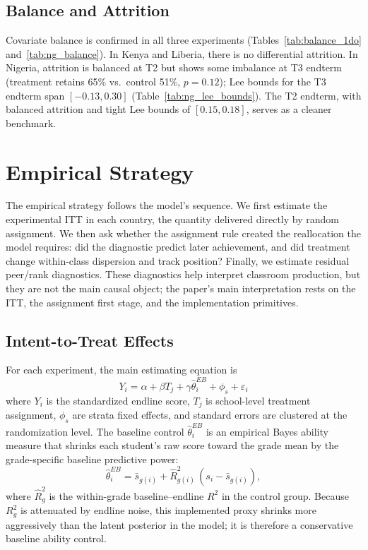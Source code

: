 \documentclass[11pt]{article}
\begin{document}
\subsection{Balance and Attrition}

Covariate balance is confirmed in all three experiments (Tables~\ref{tab:balance_1do} and~\ref{tab:ng_balance}). In Kenya and Liberia, there is no differential attrition. In Nigeria, attrition is balanced at T2 but shows some imbalance at T3 endterm (treatment retains 65\% vs.\ control 51\%, $p = 0.12$); Lee bounds for the T3 endterm span $[-0.13, 0.30]$ (Table~\ref{tab:ng_lee_bounds}). The T2 endterm, with balanced attrition and tight Lee bounds of $[0.15, 0.18]$, serves as a cleaner benchmark.


\section{Empirical Strategy}
\label{sec:strategy}

The empirical strategy follows the model's sequence. We first estimate the experimental ITT in each country, the quantity delivered directly by random assignment. We then ask whether the assignment rule created the reallocation the model requires: did the diagnostic predict later achievement, and did treatment change within-class dispersion and track position? Finally, we estimate residual peer/rank diagnostics. These diagnostics help interpret classroom production, but they are not the main causal object; the paper's main interpretation rests on the ITT, the assignment first stage, and the implementation primitives.

\subsection{Intent-to-Treat Effects}

For each experiment, the main estimating equation is
\begin{equation}
\label{eq:itt}
Y_i = \alpha + \beta T_j + \gamma \hat{\theta}^{EB}_i + \phi_s + \varepsilon_i
\end{equation}
where $Y_i$ is the standardized endline score, $T_j$ is school-level treatment assignment, $\phi_s$ are strata fixed effects, and standard errors are clustered at the randomization level. The baseline control $\hat{\theta}^{EB}_i$ is an empirical Bayes ability measure that shrinks each student's raw score toward the grade mean by the grade-specific baseline predictive power:
\begin{equation}
\label{eq:eb}
\hat{\theta}^{EB}_{i} = \bar{s}_{g(i)} + \widehat{R}^2_{g(i)}\,(s_i - \bar{s}_{g(i)}),
\end{equation}
where $\widehat{R}^2_g$ is the within-grade baseline--endline $R^2$ in the control group. Because $R^2_g$ is attenuated by endline noise, this implemented proxy shrinks more aggressively than the latent posterior in the model; it is therefore a conservative baseline ability control.
\end{document}
